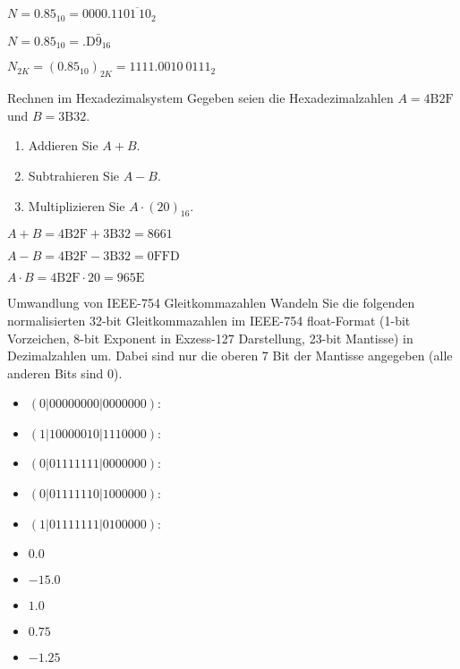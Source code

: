 \documentclass{exercisesheet}
\begin{document}
  \begin{solution}
    \item $N = 0.85_{10} = {0000.11\overline{01\ 10}}_2$
    \item $N = 0.85_{10} = {\mathrm{.D\bar{9}}}_{16}$
    \item ${N}_{2K} = (0.85_{10})_{2K} = {1111.0010\ 0111}_2$
  \end{solution}

  \begin{exercise*}{Rechnen im Hexadezimalsystem}
    Gegeben seien die Hexadezimalzahlen $A = \mathrm{4B2F}$ und $B = \mathrm{3B32}$.
    \begin{enumerate}
      \item Addieren Sie $A+B$.
      \item Subtrahieren Sie $A-B$.
      \item Multiplizieren Sie $A\cdot (20)_{16}$.
    \end{enumerate}
  \end{exercise*}

  \begin{solution}
    \item $A + B = \mathrm{4B2F} + \mathrm{3B32} = \mathrm{8661}$
    \item $A - B = \mathrm{4B2F} - \mathrm{3B32} = \mathrm{0FFD}$
    \item $A \cdot B = \mathrm{4B2F} \cdot 20 = \mathrm{965E}$
  \end{solution}

  \begin{exercise*}{Umwandlung von IEEE-754 Gleitkommazahlen}
    Wandeln Sie die folgenden normalisierten 32-bit Gleitkommazahlen im IEEE-754 float-Format (1-bit Vorzeichen, 8-bit Exponent in Exzess-127 Darstellung, 23-bit Mantisse) in Dezimalzahlen um. Dabei sind nur die oberen 7 Bit der Mantisse angegeben (alle anderen Bits sind 0).
    \begin{itemize}
      \item $(0|0000 0000|0000 000)$:
      \item $(1|1000 0010|1110 000)$:
      \item $(0|0111 1111|0000 000)$:
      \item $(0|0111 1110|1000 000)$:
      \item $(1|0111 1111|0100 000)$:
    \end{itemize}
  \end{exercise*}

  \begin{solution*}
      \begin{itemize}
        \item $0.0$
        \item $-15.0$
        \item $1.0$
        \item $0.75$
        \item $-1.25$
      \end{itemize}
  \end{solution*}
\end{document}
